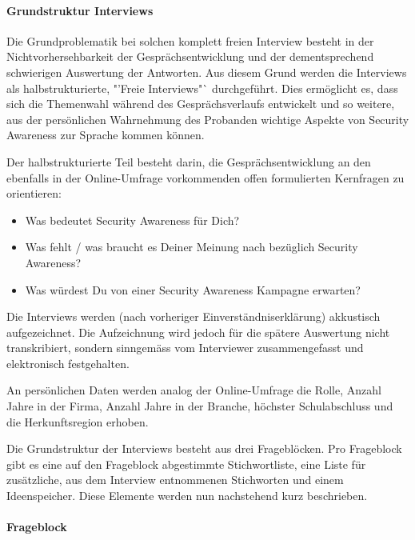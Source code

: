\documentclass[../../main.tex]{subfiles}
\begin{document}
\paragraph*{Grundstruktur Interviews}\mbox{}

\begin{sloppypar}
Die Grundproblematik bei solchen komplett freien Interview besteht in der Nichtvorhersehbarkeit der Gesprächsentwicklung und der dementsprechend schwierigen Auswertung der Antworten. Aus diesem Grund werden die Interviews als halbstrukturierte, "'Freie Interviews"` durchgeführt. Dies ermöglicht es, dass sich die Themenwahl während des Gesprächsverlaufs entwickelt und so weitere, aus der persönlichen Wahrnehmung des Probanden wichtige Aspekte von Security Awareness zur Sprache kommen können.

Der halbstrukturierte Teil besteht darin, die Gesprächsentwicklung an den ebenfalls in der Online-Umfrage vorkommenden offen formulierten Kernfragen zu orientieren:

\begin{itemize}
  \item Was bedeutet Security Awareness für Dich?
  \item Was fehlt / was braucht es Deiner Meinung nach bezüglich Security Awareness?
  \item Was würdest Du von einer Security Awareness Kampagne erwarten?
\end{itemize}


Die Interviews werden (nach vorheriger Einverständniserklärung) akkustisch aufgezeichnet. Die Aufzeichnung wird jedoch für die spätere Auswertung nicht transkribiert, sondern sinngemäss vom Interviewer zusammengefasst und elektronisch festgehalten.

An persönlichen Daten werden analog der Online-Umfrage die Rolle, Anzahl Jahre in der Firma, Anzahl Jahre in der Branche, höchster Schulabschluss und die Herkunftsregion erhoben.

Die Grundstruktur der Interviews besteht aus drei Frageblöcken. Pro Frageblock gibt es eine auf den Frageblock abgestimmte Stichwortliste, eine Liste für zusätzliche, aus dem Interview entnommenen Stichworten und einem Ideenspeicher. Diese Elemente werden nun nachstehend kurz beschrieben.
\end{sloppypar}

\paragraph*{Frageblock}\mbox{}
\end{document}
